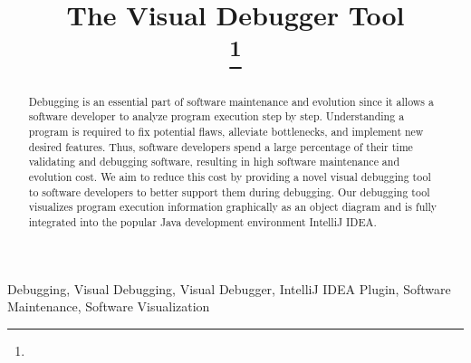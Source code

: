 \documentclass[conference]{IEEEtran}
\newcommand{\intellij}{IntelliJ IDEA}
\begin{document}
\title{The Visual Debugger Tool\\
{}
\thanks{}
}
\author{
}

\maketitle
\begin{abstract}
Debugging is an essential part of software maintenance and evolution since it allows a software developer to analyze program execution step by step.
Understanding a program is required to fix potential flaws, alleviate bottlenecks, and implement new desired features.
Thus, software developers spend a large percentage of their time validating and debugging software, resulting in high software maintenance and evolution cost.
We aim to reduce this cost by providing a novel visual debugging tool to software developers to better support them during debugging.
Our debugging tool visualizes program execution information graphically as an object diagram and is fully integrated into the popular Java development environment \intellij{}.
\end{abstract}

\begin{IEEEkeywords}
Debugging, Visual Debugging, Visual Debugger, IntelliJ IDEA Plugin, Software Maintenance, Software Visualization
\end{IEEEkeywords}
\end{document}
